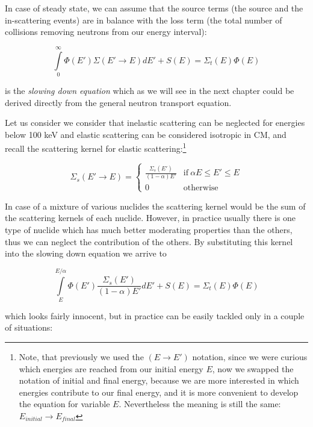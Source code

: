In case of steady state, we can assume that the source terms (the source and the in-scattering events) are in balance with the loss term (the total number of collisions removing neutrons from our energy interval):

\begin{equation}
\int\limits_0^\infty \Phi(E')\Sigma(E'\rightarrow E)dE'+S(E)=\Sigma_t(E)\Phi(E)
\end{equation}

\noindent is the \textit{slowing down equation} which as we will see in the next chapter could be derived directly from the general neutron transport equation.

Let us consider we consider that inelastic scattering can be neglected for energies below 100 keV and elastic scattering can be considered isotropic in CM, and recall the scattering kernel for elastic scattering:\footnote{Note, that previously we used the $(E\rightarrow E')$ notation, since we were curious which energies are reached from our initial energy $E$, now we swapped the notation of initial and final energy, because we are more interested in which energies contribute to our final energy, and it is more convenient to develop the equation for variable $E$. Nevertheless the meaning is still the same: $E_{initial}\rightarrow E_{final}$}

\begin{equation}\label{eq:scatkernel}
    \Sigma_s(E'\rightarrow E) = 
    \begin{cases}
      \frac{\Sigma_s(E')}{(1-\alpha)E'} & \text{if} \: \alpha E \leq E' \leq E \\
      0 & \text{otherwise}
    \end{cases}
\end{equation}

\noindent In case of a mixture of various nuclides the scattering kernel would be the sum of the scattering kernels of each nuclide. However, in practice usually there is one type of nuclide which has much better moderating properties than the others, thus we can neglect the contribution of the others. By substituting this kernel into the slowing down equation we arrive to

\begin{equation}\label{eq:slowingdown}
\int\limits_E^{E/\alpha} \Phi(E')\frac{\Sigma_s(E')}{(1-\alpha)E'}dE'+S(E)=\Sigma_t(E)\Phi(E)
\end{equation}

\noindent which looks fairly innocent, but in practice can be easily tackled only in a couple of situations:

